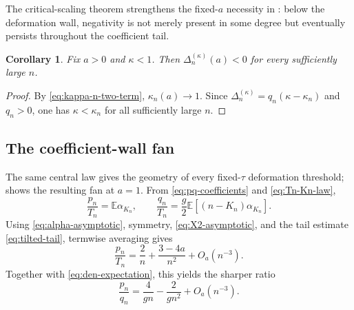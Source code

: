 \documentclass[11pt,a4paper]{amsart}
\numberwithin{equation}{section}
\theoremstyle{plain}
\newtheorem{corollary}[theorem]{Corollary}
\theoremstyle{definition}
\newcommand{\E}{\mathbb E}
\begin{document}
The critical-scaling theorem strengthens the fixed-\(a\) necessity in
: below the deformation wall, negativity is not merely
present in some degree but eventually persists throughout the coefficient tail.

\begin{corollary}\label{cor:eventual-negative-tail}
Fix \(a>0\) and \(\kappa<1\).  Then \(\Delta_n^{(\kappa)}(a)<0\)
for every sufficiently large \(n\).
\end{corollary}

\begin{proof}
By \eqref{eq:kappa-n-two-term}, \(\kappa_n(a)\to1\).  Since
\(\Delta_n^{(\kappa)}=q_n(\kappa-\kappa_n)\) and \(q_n>0\), one has
\(\kappa<\kappa_n\) for all sufficiently large \(n\).
\end{proof}


\subsection{The coefficient-wall fan}\label{subsec:wall-fan}

The same central law gives the geometry of every fixed-\(\tau\) deformation
threshold;  shows the resulting fan at \(a=1\).  From
\eqref{eq:pq-coefficients} and \eqref{eq:Tn-Kn-law},
\[
 \frac{p_n}{T_n}=\E\alpha_{K_n},
 \qquad
 \frac{q_n}{T_n}=\frac g2\E[(n-K_n)\alpha_{K_n}].
\]
Using \eqref{eq:alpha-asymptotic}, symmetry, \eqref{eq:X2-asymptotic}, and the
tail estimate \eqref{eq:tilted-tail}, termwise averaging gives
\begin{equation}\label{eq:p-over-T-two-term}
 \frac{p_n}{T_n}
 =\frac2n+\frac{3-4a}{n^2}+O_a(n^{-3}).
\end{equation}
Together with \eqref{eq:den-expectation}, this yields the sharper ratio
\begin{equation}\label{eq:pq-ratio-two-term}
 \frac{p_n}{q_n}
 =\frac4{gn}-\frac2{gn^2}+O_a(n^{-3}).
\end{equation}
\end{document}
